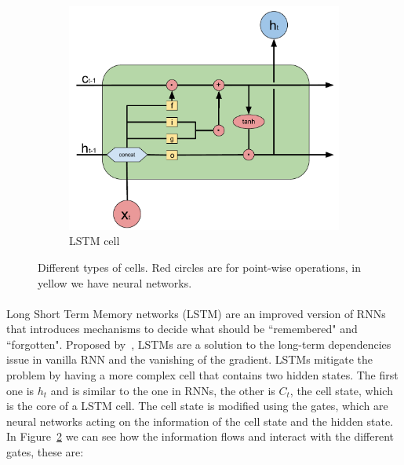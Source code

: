 \begin{figure}[]
\begin{subfigure}[t]{0.5\textwidth}
    \end{subfigure}%
    ~ 
    \begin{subfigure}[t]{0.5\textwidth}
        \centering
        \includegraphics[width=\textwidth]{images/LSTM_cell_simple.pdf}
        \caption{LSTM cell}
        \label{subfig:lstm_cell}

    \end{subfigure}
    \caption{Different types of cells. Red circles are for point-wise operations, in yellow we have neural networks.} %
    \label{fig:cells}
\end{figure} 

\paragraph{}
Long Short Term Memory networks (LSTM) are an improved version of RNNs  that introduces mechanisms to decide what should be ``remembered" and ``forgotten". Proposed by~\cite{hochreiter1997long}, LSTMs are a solution to the long-term dependencies issue in vanilla RNN and the vanishing of the gradient. LSTMs mitigate the problem by having a more complex cell that contains two hidden states. The first one is $h_t$ and is similar to the one in RNNs, the other is $C_t$, the cell state, which is the core of a LSTM cell. The cell state is modified using the gates, which are neural networks acting on the information of the cell state and the hidden state. In Figure~\ref{fig:cells} we can see how the information flows and interact with the different gates, these are:

